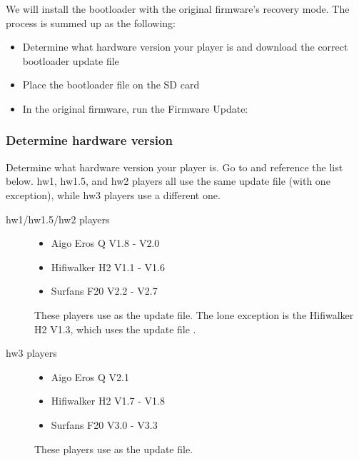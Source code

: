 We will install the bootloader with the original firmware's recovery
mode. The process is summed up as the following:

\begin{itemize}
  \item Determine what hardware version your player is and download
    the correct bootloader update file
  \item Place the bootloader  file on the SD card
  \item In the original firmware, run the Firmware Update: \\
\end{itemize}

\subsubsection{Determine hardware version}\label{ref:determine_hardware_version}
Determine what hardware version your player is. Go to  and reference
the list below. hw1, hw1.5, and hw2 players all use the same update
file (with one exception), while hw3 players use a different one.


\begin{description}
\item[hw1/hw1.5/hw2 players]
  \begin{itemize}
    \item Aigo Eros Q V1.8 - V2.0
    \item Hifiwalker H2 V1.1 - V1.6
    \item Surfans F20 V2.2 - V2.7
  \end{itemize}
  These players use  as the update file.
  The lone exception is the Hifiwalker H2 V1.3, which uses the update file
  .
\item[hw3 players]
  \begin{itemize}
    \item Aigo Eros Q V2.1
    \item Hifiwalker H2 V1.7 - V1.8
    \item Surfans F20 V3.0 - V3.3
  \end{itemize}

  These players use  as the update file.
\end{description}

